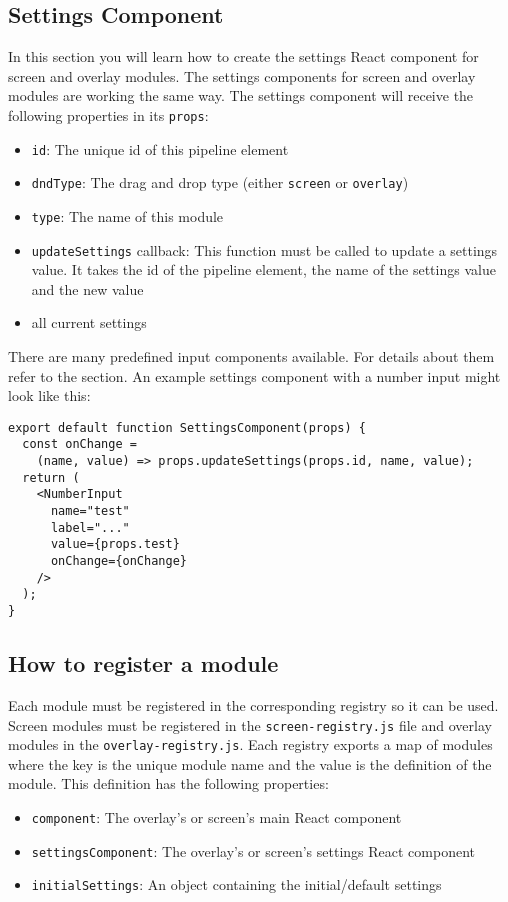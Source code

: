 \subsection{Settings Component}
\label{sec:settings-component}
In this section you will learn how to create the settings React component for screen and overlay modules.
The settings components for screen and overlay modules are working the same way. 
The settings component will receive the following properties in its \texttt{props}:
\begin{itemize}
  \item \texttt{id}: The unique id of this pipeline element
  \item \texttt{dndType}: The drag and drop type (either \texttt{screen} or \texttt{overlay})
  \item \texttt{type}: The name of this module
  \item \texttt{updateSettings} callback: This function must be called to update a settings value. 
    It takes the id of the pipeline element, the name of the settings value and the new value
  \item all current settings
\end{itemize}

There are many predefined input components available. 
For details about them refer to the  section. 
An example settings component with a number input might look like this:
\begin{verbatim}
export default function SettingsComponent(props) {
  const onChange = 
    (name, value) => props.updateSettings(props.id, name, value);
  return (
    <NumberInput 
      name="test" 
      label="..." 
      value={props.test} 
      onChange={onChange} 
    />
  );
}
\end{verbatim}

\subsection{How to register a module}
Each module must be registered in the corresponding registry so it can be used. 
Screen modules must be registered in the \texttt{screen-registry.js} file and overlay modules in the \texttt{overlay-registry.js}. 
Each registry exports a map of modules where the key is the unique module name and the value is the definition of the module. 
This definition has the following properties:
\begin{itemize}
  \item \texttt{component}: The overlay's or screen's main React component
  \item \texttt{settingsComponent}: The overlay's or screen's settings React component
  \item \texttt{initialSettings}: An object containing the initial/default settings
\end{itemize}

